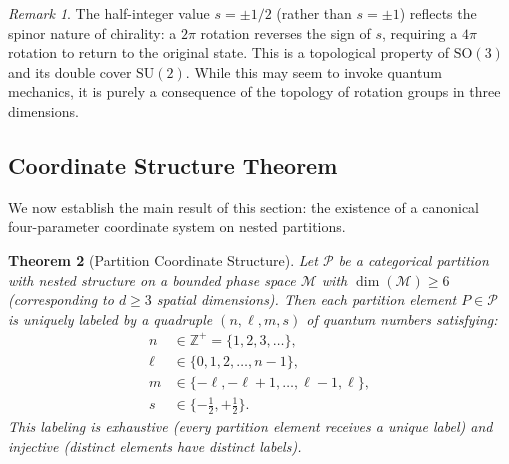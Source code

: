 \documentclass[twocolumn,10pt,a4paper]{article}
\newtheorem{theorem}{Theorem}[section]
\theoremstyle{remark}
\newtheorem{remark}[theorem]{Remark}
\newcommand{\manifold}{\mathcal{M}}
\newcommand{\partition}{\mathcal{P}}
\newcommand{\Integers}{\mathbb{Z}}
\begin{document}
\begin{remark}
The half-integer value $s = \pm 1/2$ (rather than $s = \pm 1$) reflects the spinor nature of chirality: a $2\pi$ rotation reverses the sign of $s$, requiring a $4\pi$ rotation to return to the original state. This is a topological property of $\text{SO}(3)$ and its double cover $\text{SU}(2)$. While this may seem to invoke quantum mechanics, it is purely a consequence of the topology of rotation groups in three dimensions.
\end{remark}

\subsection{Coordinate Structure Theorem}

We now establish the main result of this section: the existence of a canonical four-parameter coordinate system on nested partitions.

\begin{theorem}[Partition Coordinate Structure]
\label{thm:partition_structure}
Let $\partition$ be a categorical partition with nested structure on a bounded phase space $\manifold$ with $\dim(\manifold) \geq 6$ (corresponding to $d \geq 3$ spatial dimensions). Then each partition element $P \in \partition$ is uniquely labeled by a quadruple $(n, \ell, m, s)$ of quantum numbers satisfying:
\begin{align}
n &\in \Integers^+ = \{1, 2, 3, \ldots\}, \label{eq:n_constraint} \\
\ell &\in \{0, 1, 2, \ldots, n-1\}, \label{eq:l_constraint} \\
m &\in \{-\ell, -\ell+1, \ldots, \ell-1, \ell\}, \label{eq:m_constraint} \\
s &\in \{-\tfrac{1}{2}, +\tfrac{1}{2}\}. \label{eq:s_constraint}
\end{align}
This labeling is exhaustive (every partition element receives a unique label) and injective (distinct elements have distinct labels).
\end{theorem}
\end{document}
